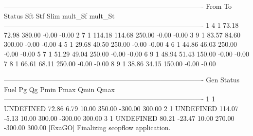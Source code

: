 ----------------------------------------------------------------------------------------
From       To       Status     Sft      Stf     Slim     mult_Sf  mult_St 
----------------------------------------------------------------------------------------
1          4          1       73.18    72.98   380.00    -0.00    -0.00
2          7          1      114.18   114.68   250.00    -0.00    -0.00
3          9          1       83.57    84.60   300.00    -0.00    -0.00
4          5          1       29.68    40.50   250.00    -0.00    -0.00
4          6          1       44.86    46.03   250.00    -0.00    -0.00
5          7          1       51.29    49.04   250.00    -0.00    -0.00
6          9          1       48.94    51.43   150.00    -0.00    -0.00
7          8          1       66.61    68.11   250.00    -0.00    -0.00
8          9          1       38.86    34.15   150.00    -0.00    -0.00

----------------------------------------------------------------------------------------
Gen      Status     Fuel     Pg       Qg       Pmin     Pmax     Qmin     Qmax  
----------------------------------------------------------------------------------------
1          1    UNDEFINED    72.86     6.79    10.00   350.00  -300.00   300.00
2          1    UNDEFINED   114.07    -5.13    10.00   300.00  -300.00   300.00
3          1    UNDEFINED    80.21   -23.47    10.00   270.00  -300.00   300.00
[ExaGO] Finalizing scopflow application.
